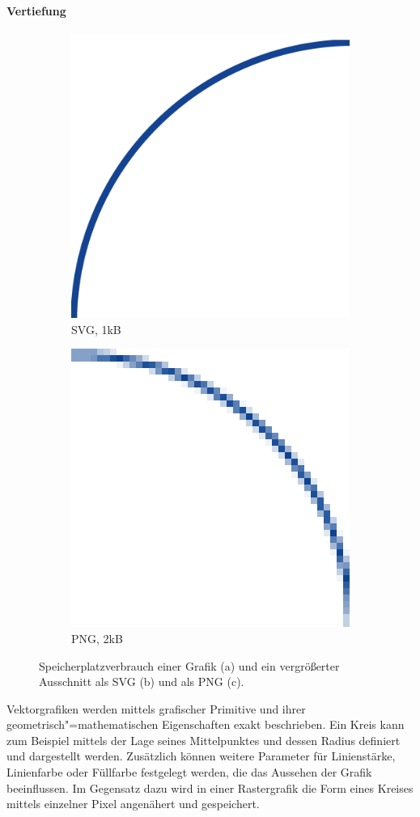 \paragraph{Vertiefung}
\begin{figure}\vspace{-0.6cm}
  \begin{center}
	\begin{subfigure}[t]{0.12\textwidth}
		\centering
		\caption{}
	\end{subfigure}%
	\begin{subfigure}[t]{0.19\textwidth}
		\centering
		\includegraphics[width=0.4\linewidth]{bilder/vektor_vergroesserungB}
		\caption{SVG, 1kB}
	\end{subfigure}%
	\begin{subfigure}[t]{0.19\textwidth}
		\centering
		\includegraphics[width=0.4\linewidth]{bilder/vektor_vergroesserungC}
		\caption{PNG, 2kB}
	\end{subfigure}%
  \end{center}
  \caption{Speicherplatzverbrauch einer Grafik (a) und ein vergrößerter Ausschnitt als SVG (b) und als PNG (c).}
	\label{abb:vektor_speicherplatz}
\end{figure}
Vektorgrafiken werden mittels grafischer Primitive und ihrer geometrisch"=mathematischen Eigenschaften exakt beschrieben. Ein Kreis kann zum Beispiel mittels der Lage seines Mittelpunktes und dessen Radius definiert und dargestellt werden. Zusätzlich können weitere Parameter für Linienstärke, Linienfarbe oder Füllfarbe festgelegt werden, die das Aussehen der Grafik beeinflussen. Im Gegensatz dazu wird in einer Rastergrafik die Form eines Kreises mittels einzelner Pixel angenähert und  gespeichert.

